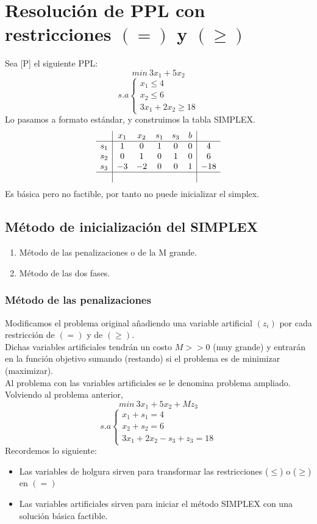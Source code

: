 \documentclass[11pt,fleqn]{book} %
\begin{document}
\section{Resolución de PPL con restricciones $(=)$ y $(\geq)$}
Sea [P] el siguiente PPL:
$$ min ~ 3x_1+5x_2 $$
$$ s.a \left\{
\begin{array}{c}
  x_1 \leq 4 \\
  x_2 \leq 6 \\
  3x_1+2x_2 \geq 18
\end{array}
\right.
$$
Lo pasamos a formato estándar, y construimos la tabla SIMPLEX.
$$
\begin{array}{c|ccccc|c} 
  & x_1 & x_2 & s_1 & s_3 & b \\ \hline
  s_1 & 1 & 0 & 1 & 0 & 0 & 4 \\
  s_2 & 0 & 1 & 0 & 1 & 0 & 6 \\
  s_3 & -3 & -2 & 0 & 0 & 1 & -18 \\ \hline
  & & & & &
\end{array}
$$
Es básica pero no factible, por tanto no puede inicializar el simplex.

\subsection{Método de inicialización del SIMPLEX}
\begin{enumerate}
\item Método de las penalizaciones o de la M grande.
\item Método de las dos fases.
\end{enumerate}

\subsubsection{Método de las penalizaciones}
Modificamos el problema original añadiendo una variable artificial $(z_i)$ por cada restricción de $(=)$ y de $(\geq)$. \\
Dichas variables artificiales tendrán un costo $M>>0$ (muy grande) y entrarán en la función objetivo sumando (restando) si el problema es de minimizar (maximizar). \\
Al problema con las variables artificiales se le denomina problema ampliado. \\

Volviendo al problema anterior, 
$$ min ~ 3x_1+5x_2+M z_3 $$
$$ s.a \left\{
\begin{array}{c}
  x_1+s_1=4 \\
  x_2 + s_2 = 6 \\
  3x_1+2x_2-s_3+z_3=18
\end{array}
\right.
$$
Recordemos lo siguiente:
\begin{itemize}
\item Las variables de holgura sirven para transformar las restricciones ($\leq$) o ($\geq$) en $(=)$
\item Las variables artificiales sirven para iniciar el método SIMPLEX con una solución básica factible.
\end{itemize}
\end{document}

